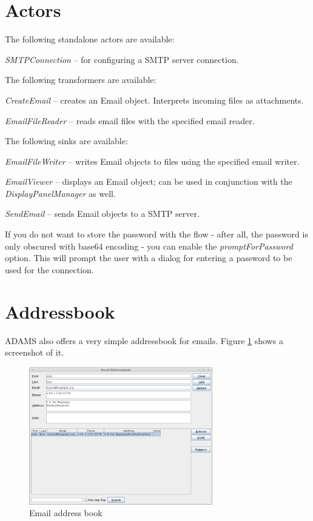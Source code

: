 \documentclass[a4paper]{book}
\begin{document}
\section{Actors}
The following standalone actors are available:
\begin{tight_itemize}
	\item \textit{SMTPConnection} -- for configuring a SMTP server connection.
\end{tight_itemize}
The following transformers are available:
\begin{tight_itemize}
	\item \textit{CreateEmail} -- creates an Email object. Interprets incoming files
	as attachments.
	\item \textit{EmailFileReader} -- reads email files with the specified email reader.
\end{tight_itemize}
The following sinks are available:
\begin{tight_itemize}
	\item \textit{EmailFileWriter} -- writes Email objects to files using the specified
	email writer.
	\item \textit{EmailViewer} -- displays an Email object; can be used in conjunction 
	with the \textit{DisplayPanelManager} as well.
	\item \textit{SendEmail} -- sends Email objects to a SMTP server.
\end{tight_itemize}

If you do not want to store the password with the flow - after all, the password
is only obscured with base64 encoding - you can enable the 
\textit{promptForPassword} option. This will prompt the user with a dialog 
for entering a password to be used for the connection.

\section{Addressbook}
ADAMS also offers a very simple addressbook for emails. Figure \ref{email_address_book}
shows a screenshot of it.
\begin{figure}[htb]
  \centering
  \includegraphics[width=8.0cm]{images/email_addressbook.png}
  \caption{Email address book}
  \label{email_address_book}
\end{figure}
\end{document}
